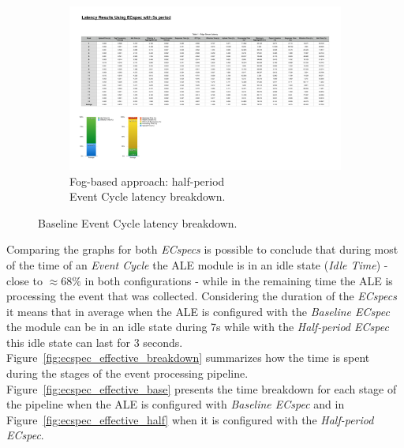 \begin{figure}[ht!]
\begin{subfigure}{.5\textwidth}
   \includegraphics[height=\linewidth]{./images/edge_ecspecf_breakdown}
   \caption{Fog-based approach: half-period\\Event Cycle latency breakdown.}
   \label{fig:ecspec_half}
 \end{subfigure}
 \caption{Baseline Event Cycle latency breakdown.}
 \label{fig:ecspec_breakdown}
\end{figure}

Comparing the graphs for both \textit{ECspecs} is possible to conclude that during most of the time of
an \textit{Event Cycle} the \gls{ALE} module is in an idle state (\textit{Idle Time}) - close to $\approx68\%$
in both configurations - while in the remaining time the \gls{ALE} is processing the event that was
collected. Considering the duration of the \textit{ECspecs} it means that in average when the \gls{ALE}
is configured with the \textit{Baseline ECspec} the module can be in an idle state during 7s while
with the \textit{Half-period ECspec} this idle state can last for 3 seconds.\\

Figure~\ref{fig:ecspec_effective_breakdown} summarizes how the time is spent during the stages of the
event processing pipeline. Figure~\ref{fig:ecspec_effective_base} presents the time breakdown for
each stage of the pipeline when the \gls{ALE} is configured with \textit{Baseline ECspec} and in
Figure~\ref{fig:ecspec_effective_half} when it is configured with the \textit{Half-period ECspec}.\\

